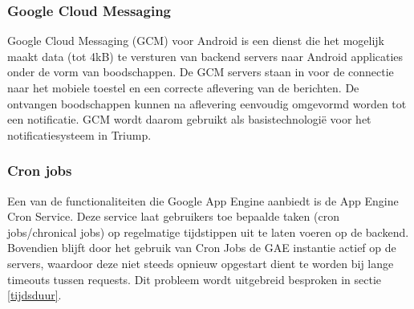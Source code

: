 \subsubsection{Google Cloud Messaging~\cite{Google_Cloud_Messaging}}

Google Cloud Messaging (GCM) voor Android is een dienst die het mogelijk maakt data (tot 4kB) te versturen van backend servers naar Android applicaties onder de vorm van boodschappen. De GCM servers staan in voor de connectie naar het mobiele toestel en een correcte aflevering van de berichten. De ontvangen boodschappen kunnen na aflevering eenvoudig omgevormd worden tot een notificatie. GCM wordt daarom gebruikt als basistechnologië voor het notificatiesysteem in Triump.

\subsubsection{Cron jobs~\cite{Google_Cron_Jobs}}

Een van de functionaliteiten die Google App Engine aanbiedt is de App Engine Cron Service. Deze service laat gebruikers toe bepaalde taken (cron jobs/chronical jobs) op regelmatige tijdstippen uit te laten voeren op de backend. Bovendien blijft door het gebruik van Cron Jobs de GAE instantie actief op de servers, waardoor deze niet steeds opnieuw opgestart dient te worden bij lange timeouts tussen requests. Dit probleem wordt uitgebreid besproken in sectie \ref{tijdsduur}.


